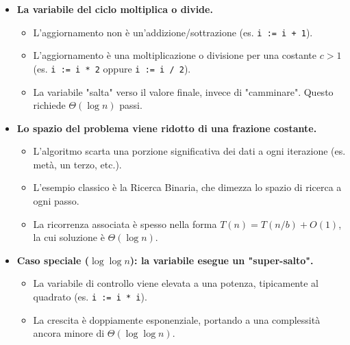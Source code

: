 \begin{itemize}
    \item \textbf{La variabile del ciclo moltiplica o divide.}
        \begin{itemize}
            \item L'aggiornamento non è un'addizione/sottrazione (es. \texttt{i := i + 1}).
            \item L'aggiornamento è una moltiplicazione o divisione per una costante $c > 1$ (es. \texttt{i := i * 2} oppure \texttt{i := i / 2}).
            \item La variabile "salta" verso il valore finale, invece di "camminare". Questo richiede $\Theta(\log n)$ passi.
        \end{itemize}
    
    \item \textbf{Lo spazio del problema viene ridotto di una frazione costante.}
        \begin{itemize}
            \item L'algoritmo scarta una porzione significativa dei dati a ogni iterazione (es. metà, un terzo, etc.).
            \item L'esempio classico è la Ricerca Binaria, che dimezza lo spazio di ricerca a ogni passo.
            \item La ricorrenza associata è spesso nella forma $T(n) = T(n/b) + O(1)$, la cui soluzione è $\Theta(\log n)$.
        \end{itemize}

    \item \textbf{Caso speciale ($\log \log n$): la variabile esegue un "super-salto".}
        \begin{itemize}
            \item La variabile di controllo viene elevata a una potenza, tipicamente al quadrato (es. \texttt{i := i * i}).
            \item La crescita è doppiamente esponenziale, portando a una complessità ancora minore di $\Theta(\log \log n)$.
        \end{itemize}
\end{itemize}

